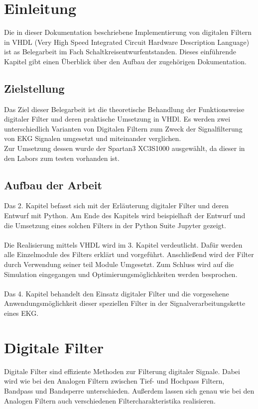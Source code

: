 \documentclass[
paper = a4,
fontsize = 11pt,
numbers=noenddot,
headsepline = true,
footsepline = true,
plainfootsepline = true,
parskip,								        %
listof = totoc,
bibliography = totoc,
index = totoc,
twoside = false
]{scrreprt}
\begin{document}
	
	
	\tableofcontents
	\newpage
	
	\chapter{Einleitung}
	Die in dieser Dokumentation beschriebene Implementierung von digitalen Filtern in VHDL  (Very High Speed Integrated Circuit Hardware Description Language) ist as Belegarbeit im Fach \textacutedbl Schaltkreisentwurf\textgravedbl entstanden. Dieses einführende Kapitel gibt einen Überblick über den Aufbau der zugehörigen Dokumentation.
	
	\section{Zielstellung}
	Das Ziel dieser Belegarbeit ist die theoretische Behandlung der Funktionsweise digitaler Filter und deren praktische Umsetzung in VHDl. Es werden zwei unterschiedlich Varianten von Digitalen Filtern zum Zweck der Signalfilterung von EKG Signalen umgesetzt und miteinander verglichen.\\
	Zur Umsetzung dessen wurde der Spartan3 XC3S1000 ausgewählt, da dieser in den Labors zum testen vorhanden ist.
	\section{Aufbau der Arbeit}
	Das 2. Kapitel befasst sich mit der Erläuterung digitaler Filter und deren Entwurf mit Python. Am Ende des Kapitels wird beispielhaft der Entwurf und die Umsetzung eines solchen Filters in der Python Suite Jupyter gezeigt.\\
	\\
	Die Realisierung mittels VHDL wird im 3. Kapitel verdeutlicht. Dafür werden alle Einzelmodule des Filters erklärt und vorgeführt. Anschließend wird der Filter durch Verwendung seiner teil Module Umgesetzt. Zum Schluss wird auf die Simulation eingegangen und Optimierungsmöglichkeiten werden besprochen.\\
	\\
	Das 4. Kapitel behandelt den Einsatz digitaler Filter und die vorgesehene Anwendungsmöglichkeit dieser speziellen Filter in der Signalverarbeitungskette eines EKG.
	
	\chapter{Digitale Filter}
	Digitale Filter sind effiziente Methoden zur Filterung digitaler Signale. Dabei wird wie bei den Analogen Filtern zwischen Tief- und Hochpass Filtern, Bandpass und Bandsperre unterschieden. Außerdem lassen sich genau wie bei den Analogen Filtern auch verschiedenen Filtercharakteristika realisieren.

	
\end{document}
